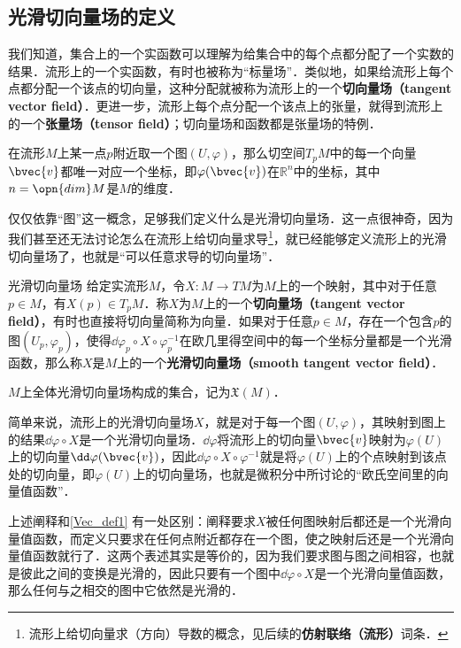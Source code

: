 
\subsection{光滑切向量场的定义}

我们知道，集合上的一个实函数可以理解为给集合中的每个点都分配了一个实数的结果．流形上的一个实函数，有时也被称为“标量场”．类似地，如果给流形上每个点都分配一个该点的切向量，这种分配就被称为流形上的一个\textbf{切向量场（tangent vector field）}．更进一步，流形上每个点分配一个该点上的张量，就得到流形上的一个\textbf{张量场（tensor field）}；切向量场和函数都是张量场的特例．


在流形$M$上某一点$p$附近取一个图$(U, \varphi)$，那么切空间$T_pM$中的每一个向量$\bvec{v}$都唯一对应一个坐标，即$\varphi(\bvec{v})$在$\mathbb{R}^n$中的坐标，其中$n=\opn{dim}M$是$M$的维度．

仅仅依靠“图”这一概念，足够我们定义什么是光滑切向量场．这一点很神奇，因为我们甚至还无法讨论怎么在流形上给切向量求导\footnote{流形上给切向量求（方向）导数的概念，见后续的\textbf{仿射联络（流形）}词条．}，就已经能够定义流形上的光滑切向量场了，也就是“可以任意求导的切向量场”．

\begin{definition}{光滑切向量场}\label{Vec_def1}
给定实流形$M$，令$X:M\to TM$为$M$上的一个映射，其中对于任意$p\in M$，有$X(p)\in T_pM$．称$X$为$M$上的一个\textbf{切向量场（tangent vector field）}，有时也直接将切向量简称为向量．如果对于任意$p\in M$，存在一个包含$p$的图$(U_p, \varphi_p)$，使得$\dd\varphi_p\circ X\circ\varphi_p^{-1}$在欧几里得空间中的每一个坐标分量都是一个光滑函数，那么称$X$是$M$上的一个\textbf{光滑切向量场（smooth tangent vector field）}．

$M$上全体光滑切向量场构成的集合，记为$\mathfrak{X}(M)$．
\end{definition}

简单来说，流形上的光滑切向量场$X$，就是对于每一个图$(U, \varphi)$，其映射到图上的结果$\dd\varphi\circ X$是一个光滑切向量场．$\dd\varphi$将流形上的切向量$\bvec{v}$映射为$\varphi(U)$上的切向量$\dd\varphi(\bvec{v})$，因此$\dd\varphi\circ X\circ\varphi^{-1}$就是将$\varphi(U)$上的个点映射到该点处的切向量，即$\varphi(U)$上的切向量场，也就是微积分中所讨论的“欧氏空间里的向量值函数”．

上述阐释和\autoref{Vec_def1} 有一处区别：阐释要求$X$被任何图映射后都还是一个光滑向量值函数，而定义只要求在任何点附近都存在一个图，使之映射后还是一个光滑向量值函数就行了．这两个表述其实是等价的，因为我们要求图与图之间相容，也就是彼此之间的变换是光滑的，因此只要有一个图中$\dd\varphi\circ X$是一个光滑向量值函数，那么任何与之相交的图中它依然是光滑的．

